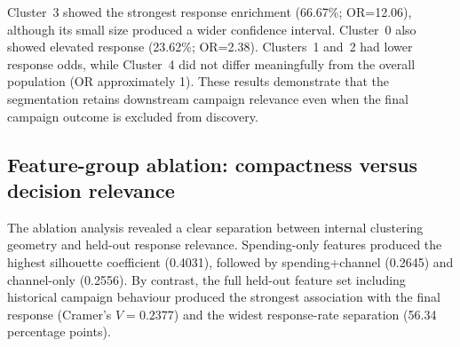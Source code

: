 \documentclass[10pt]{article}
\begin{document}
Cluster~3 showed the strongest response enrichment (66.67\%; OR=12.06), although its small size produced a wider confidence interval. Cluster~0 also showed elevated response (23.62\%; OR=2.38). Clusters~1 and~2 had lower response odds, while Cluster~4 did not differ meaningfully from the overall population (OR approximately 1). These results demonstrate that the segmentation retains downstream campaign relevance even when the final campaign outcome is excluded from discovery.

\subsection{Feature-group ablation: compactness versus decision relevance}
The ablation analysis revealed a clear separation between internal clustering geometry and held-out response relevance. Spending-only features produced the highest silhouette coefficient (0.4031), followed by spending+channel (0.2645) and channel-only (0.2556). By contrast, the full held-out feature set including historical campaign behaviour produced the strongest association with the final response (Cramer's $V=0.2377$) and the widest response-rate separation (56.34 percentage points).

\begin{table}[!ht]
\centering
\caption{Feature-group ablation results for Ward clustering at $k=5$.}
\label{tab:ablation}
\end{table}
\end{document}
